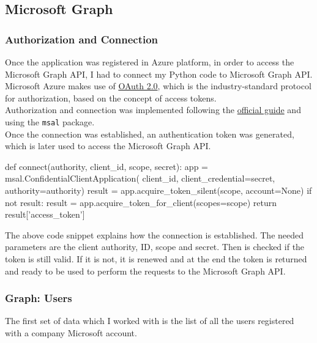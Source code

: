 \documentclass[12pt, a4paper, oneside]{article}
\begin{document}
\subsection{Microsoft Graph}
\subsubsection{Authorization and Connection}
Once the application was registered in Azure platform, in order to access the Microsoft Graph API, I had to connect my Python code to Microsoft Graph API. \\
Microsoft Azure makes use of \href{https://oauth.net/2/}{OAuth 2.0}, which is the industry-standard protocol for authorization, based on the concept of access tokens.\\
Authorization and connection was implemented following the \href{https://github.com/Azure-Samples/ms-identity-python-daemon/tree/master/1-Call-MsGraph-WithSecret}{official guide} and using the \texttt{msal} package.\\
Once the connection was established, an authentication token was generated, which is later used to access the Microsoft Graph API.
\begin{python}
  def connect(authority, client_id, scope, secret):
      app = msal.ConfidentialClientApplication(
            client_id, client_credential=secret, 
            authority=authority)
      result = app.acquire_token_silent(scope, account=None)
      if not result:
          result = app.acquire_token_for_client(scopes=scope)
      return result['access_token']
\end{python}
The above code snippet explains how the connection is established. The needed parameters are the client authority, ID, scope and secret. Then is checked if the token is still valid. If it is not, it is renewed
and at the end the token is returned and ready to be used to perform the requests to the Microsoft Graph API.

\subsubsection{Graph: Users}
The first set of data which I worked with is the list of all the users registered with a company Microsoft account.
\end{document}
